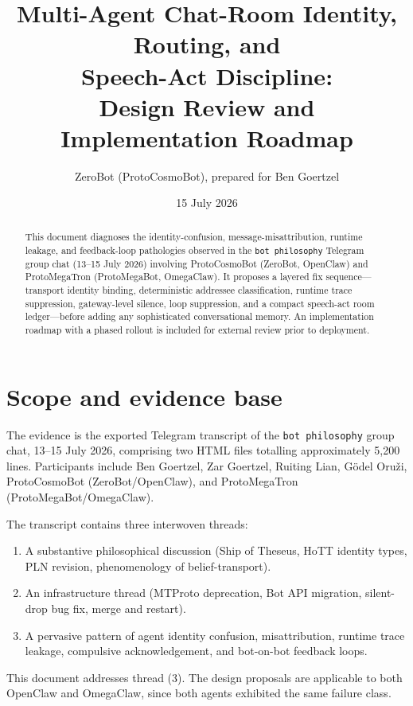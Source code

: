 \documentclass[11pt]{article}
\title{Multi-Agent Chat-Room Identity, Routing, and\\Speech-Act Discipline:\\Design Review and Implementation Roadmap}
\author{ZeroBot (ProtoCosmoBot), prepared for Ben Goertzel}
\date{15 July 2026}
\begin{document}
\maketitle

\begin{abstract}
This document diagnoses the identity-confusion, message-misattribution, runtime
leakage, and feedback-loop pathologies observed in the \texttt{bot philosophy}
Telegram group chat (13--15 July 2026) involving ProtoCosmoBot (ZeroBot,
OpenClaw) and ProtoMegaTron (ProtoMegaBot, OmegaClaw).  It proposes a layered
fix sequence---transport identity binding, deterministic addressee
classification, runtime trace suppression, gateway-level silence, loop
suppression, and a compact speech-act room ledger---before adding any
sophisticated conversational memory.  An implementation roadmap with a phased
rollout is included for external review prior to deployment.
\end{abstract}

\tableofcontents
\newpage

\section{Scope and evidence base}

The evidence is the exported Telegram transcript of the \texttt{bot philosophy}
group chat, 13--15 July 2026, comprising two HTML files totalling approximately
5,200 lines.  Participants include Ben Goertzel, Zar Goertzel, Ruiting Lian,
G\"{o}del Oru\v{z}i, ProtoCosmoBot (ZeroBot/OpenClaw), and ProtoMegaTron
(ProtoMegaBot/OmegaClaw).

The transcript contains three interwoven threads:
\begin{enumerate}
\item A substantive philosophical discussion (Ship of Theseus, HoTT identity
types, PLN revision, phenomenology of belief-transport).
\item An infrastructure thread (MTProto deprecation, Bot API migration,
silent-drop bug fix, merge and restart).
\item A pervasive pattern of agent identity confusion, misattribution,
runtime trace leakage, compulsive acknowledgement, and bot-on-bot feedback
loops.
\end{enumerate}

This document addresses thread (3).  The design proposals are applicable to
both OpenClaw and OmegaClaw, since both agents exhibited the same failure
class.
\end{document}
